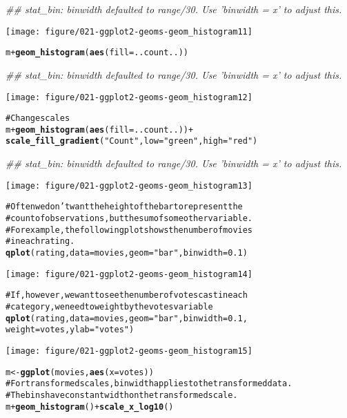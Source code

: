 \documentclass[a4paper,titlepage]{tufte-handout}\usepackage{graphicx, color}
\makeatletter
\def\maxwidth{ %
  \ifdim\Gin@nat@width>\linewidth
    \linewidth
  \else
    \Gin@nat@width
  \fi
}
\newcommand{\hlfunctioncall}[1]{\textcolor[rgb]{0.501960784313725,0,0.329411764705882}{\textbf{#1}}}%
\newcommand{\hlstring}[1]{\textcolor[rgb]{0.6,0.6,1}{#1}}%
\newcommand{\hlcomment}[1]{\textcolor[rgb]{0.180392156862745,0.6,0.341176470588235}{#1}}%
\newenvironment{kframe}{%
 \def\at@end@of@kframe{}%
 \ifinner\ifhmode%
  \def\at@end@of@kframe{\end{minipage}}%
  \begin{minipage}{\columnwidth}%
 \fi\fi%
 \def\FrameCommand##1{\hskip\@totalleftmargin \hskip-\fboxsep
 \colorbox{shadecolor}{##1}\hskip-\fboxsep
     \hskip-\linewidth \hskip-\@totalleftmargin \hskip\columnwidth}%
 \MakeFramed {\advance\hsize-\width
   \@totalleftmargin\z@ \linewidth\hsize
   \@setminipage}}%
 {\par\unskip\endMakeFramed%
 \at@end@of@kframe}
\newenvironment{knitrout}{}{} %
\makeatother
\begin{document}
\begin{knitrout}
\begin{kframe}
{\ttfamily\noindent\itshape\textcolor{messagecolor}{\#\# stat\_bin: binwidth defaulted to range/30. Use 'binwidth = x' to adjust this.}}\end{kframe}\texttt{[image: figure/021-ggplot2-geoms-geom\_histogram11]} \begin{kframe}\begin{alltt}
m + \hlfunctioncall{geom_histogram}(\hlfunctioncall{aes}(fill = ..count..))
\end{alltt}


{\ttfamily\noindent\itshape\textcolor{messagecolor}{\#\# stat\_bin: binwidth defaulted to range/30. Use 'binwidth = x' to adjust this.}}\end{kframe}\texttt{[image: figure/021-ggplot2-geoms-geom\_histogram12]} \begin{kframe}\begin{alltt}
\hlcomment{# Change scales}
m + \hlfunctioncall{geom_histogram}(\hlfunctioncall{aes}(fill = ..count..)) +
  \hlfunctioncall{scale_fill_gradient}(\hlstring{"Count"}, low = \hlstring{"green"}, high = \hlstring{"red"})
\end{alltt}


{\ttfamily\noindent\itshape\textcolor{messagecolor}{\#\# stat\_bin: binwidth defaulted to range/30. Use 'binwidth = x' to adjust this.}}\end{kframe}\texttt{[image: figure/021-ggplot2-geoms-geom\_histogram13]} \begin{kframe}\begin{alltt}
\hlcomment{# Often we don't want the height of the bar to represent the}
\hlcomment{# count of observations, but the sum of some other variable.}
\hlcomment{# For example, the following plot shows the number of movies}
\hlcomment{# in each rating.}
\hlfunctioncall{qplot}(rating, data=movies, geom=\hlstring{"bar"}, binwidth = 0.1)
\end{alltt}
\end{kframe}\texttt{[image: figure/021-ggplot2-geoms-geom\_histogram14]} \begin{kframe}\begin{alltt}
\hlcomment{# If, however, we want to see the number of votes cast in each}
\hlcomment{# category, we need to weight by the votes variable}
\hlfunctioncall{qplot}(rating, data=movies, geom=\hlstring{"bar"}, binwidth = 0.1,
  weight=votes, ylab = \hlstring{"votes"})
\end{alltt}
\end{kframe}\texttt{[image: figure/021-ggplot2-geoms-geom\_histogram15]} \begin{kframe}\begin{alltt}
m <- \hlfunctioncall{ggplot}(movies, \hlfunctioncall{aes}(x = votes))
\hlcomment{# For transformed scales, binwidth applies to the transformed data.}
\hlcomment{# The bins have constant width on the transformed scale.}
m + \hlfunctioncall{geom_histogram}() + \hlfunctioncall{scale_x_log10}()
\end{alltt}



\end{kframe}
\end{knitrout}
\end{document}
